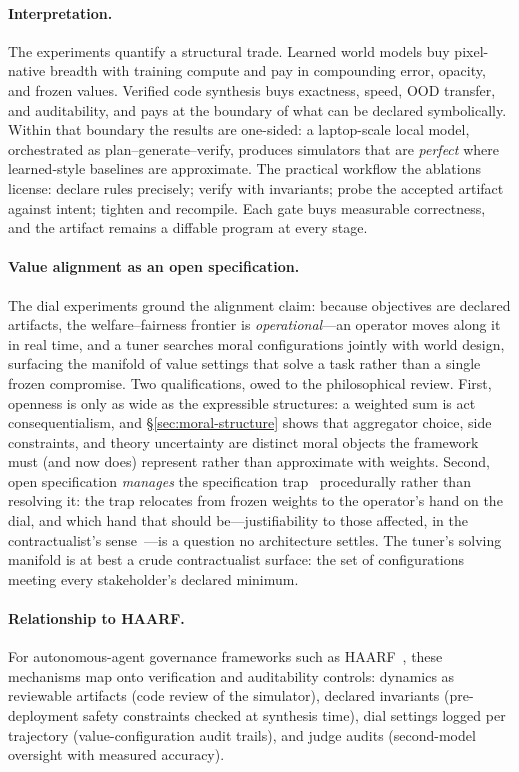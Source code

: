 \documentclass[11pt]{article}
\begin{document}
\paragraph{Interpretation.} The experiments quantify a structural trade.
Learned world models buy pixel-native breadth with training compute and pay
in compounding error, opacity, and frozen values. Verified code synthesis
buys exactness, speed, OOD transfer, and auditability, and pays at the
boundary of what can be declared symbolically. Within that boundary the
results are one-sided: a laptop-scale local model, orchestrated as
plan--generate--verify, produces simulators that are \emph{perfect} where
learned-style baselines are approximate. The practical workflow the ablations
license: declare rules precisely; verify with invariants; probe the accepted
artifact against intent; tighten and recompile. Each gate buys measurable
correctness, and the artifact remains a diffable program at every stage.

\paragraph{Value alignment as an open specification.} The dial experiments
ground the alignment claim: because objectives are declared artifacts, the
welfare--fairness frontier is \emph{operational}---an operator moves along it
in real time, and a tuner searches moral configurations jointly with world
design, surfacing the manifold of value settings that solve a task rather
than a single frozen compromise. Two qualifications, owed to the
philosophical review. First, openness is only as wide as the expressible
structures: a weighted sum is act consequentialism, and
\S\ref{sec:moral-structure} shows that aggregator choice, side constraints,
and theory uncertainty are distinct moral objects the framework must (and
now does) represent rather than approximate with weights. Second, open
specification \emph{manages} the specification trap~\cite{spectrap2025}
procedurally rather than resolving it: the trap relocates from frozen
weights to the operator's hand on the dial, and which hand that should
be---justifiability to those affected, in the contractualist's
sense~\cite{scanlon1998}---is a question no architecture settles. The
tuner's solving manifold is at best a crude contractualist surface: the set
of configurations meeting every stakeholder's declared minimum.

\paragraph{Relationship to HAARF.} For autonomous-agent governance frameworks
such as HAARF~\cite{haarf2026}, these mechanisms map onto verification and
auditability controls: dynamics as reviewable artifacts (code review of the
simulator), declared invariants (pre-deployment safety constraints checked at
synthesis time), dial settings logged per trajectory (value-configuration
audit trails), and judge audits (second-model oversight with measured
accuracy).
\end{document}
